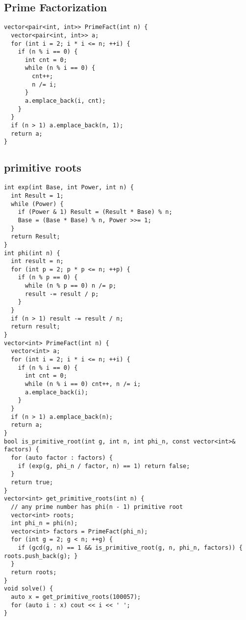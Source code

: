 \documentclass[twoside]{article}
\begin{document}
\begin{multicols*}{2}
{\subsection*{Prime Factorization}
}
\begin{verbatim}
vector<pair<int, int>> PrimeFact(int n) {
  vector<pair<int, int>> a;
  for (int i = 2; i * i <= n; ++i) {
    if (n % i == 0) {
      int cnt = 0;
      while (n % i == 0) {
        cnt++;
        n /= i;
      }
      a.emplace_back(i, cnt);
    }
  }
  if (n > 1) a.emplace_back(n, 1);
  return a;
}
\end{verbatim}

{
\subsection*{primitive roots}
}
\begin{verbatim}
int exp(int Base, int Power, int n) {
  int Result = 1;
  while (Power) {
    if (Power & 1) Result = (Result * Base) % n;
    Base = (Base * Base) % n, Power >>= 1;
  }
  return Result;
}
int phi(int n) {
  int result = n;
  for (int p = 2; p * p <= n; ++p) {
    if (n % p == 0) {
      while (n % p == 0) n /= p;
      result -= result / p;
    }
  }
  if (n > 1) result -= result / n;
  return result;
}
vector<int> PrimeFact(int n) {
  vector<int> a;
  for (int i = 2; i * i <= n; ++i) {
    if (n % i == 0) {
      int cnt = 0;
      while (n % i == 0) cnt++, n /= i;
      a.emplace_back(i);
    }
  }
  if (n > 1) a.emplace_back(n);
  return a;
}
bool is_primitive_root(int g, int n, int phi_n, const vector<int>& factors) {
  for (auto factor : factors) {
    if (exp(g, phi_n / factor, n) == 1) return false;
  }
  return true;
}
vector<int> get_primitive_roots(int n) {
  // any prime number has phi(n - 1) primitive root
  vector<int> roots;
  int phi_n = phi(n);
  vector<int> factors = PrimeFact(phi_n);
  for (int g = 2; g < n; ++g) {
    if (gcd(g, n) == 1 && is_primitive_root(g, n, phi_n, factors)) { roots.push_back(g); }
  }
  return roots;
}
void solve() {
  auto x = get_primitive_roots(100057);
  for (auto i : x) cout << i << ' ';
}

\end{verbatim}


\end{multicols*}
\end{document}
